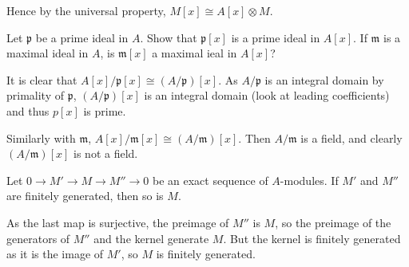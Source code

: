 \documentclass[a4paper]{exam}
\begin{document}
\begin{questions}
\begin{solution}
		Hence by the universal property, $M[x] \cong A[x] \otimes M $.
	\end{solution}

	\question Let $\mathfrak{p} $ be a prime ideal in $A $. Show that $\mathfrak{p}[x] $ is a prime ideal in $A[x] $. If $\mathfrak{m} $ is a maximal ideal in $A $, is $\mathfrak{m}[x] $ a maximal ieal in $A[x] $?
	\begin{solution}
		It is clear that $A[x] / \mathfrak{p}[x] \cong (A / \mathfrak{p})[x]$.
		As $A / \mathfrak{p} $ is an integral domain by primality of $\mathfrak{p} $, $(A / \mathfrak{p})[x] $ is an integral domain (look at leading coefficients) and thus $p[x]$ is prime.

		Similarly with $\mathfrak{m} $, $A[x] / \mathfrak{m}[x] \cong (A / \mathfrak{m})[x]$.
		Then $A / \mathfrak{m} $ is a field, and clearly $(A / \mathfrak{m})[x] $ is not a field.
	\end{solution}

	\question

	\question Let $0\to M'\to M\to M''\to 0 $ be an exact sequence of $A$-modules. If $M' $ and $M'' $ are finitely generated, then so is $M $.
	\begin{solution}
		As the last map is surjective, the preimage of $M'' $ is $M $, so the preimage of the generators of $M'' $ and the kernel generate $M $.
		But the kernel is finitely generated as it is the image of $M' $, so $M $ is finitely generated.
	\end{solution}


\end{questions}
\end{document}
